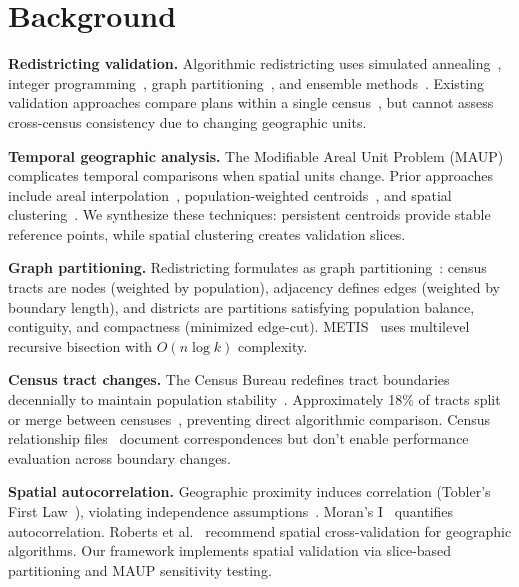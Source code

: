 \section{Background}
\label{sec:background}

\textbf{Redistricting validation.} Algorithmic redistricting uses simulated annealing~\cite{altman1998}, integer programming~\cite{mehrotra1998}, graph partitioning~\cite{ricca2008}, and ensemble methods~\cite{duchin2018, gerrychain2018}. Existing validation approaches compare plans within a single census~\cite{deford2021, fifield2020}, but cannot assess cross-census consistency due to changing geographic units.

\textbf{Temporal geographic analysis.} The Modifiable Areal Unit Problem (MAUP)~\cite{openshaw1984} complicates temporal comparisons when spatial units change. Prior approaches include areal interpolation~\cite{goodchild1980}, population-weighted centroids~\cite{cromley1996}, and spatial clustering~\cite{logan2014}. We synthesize these techniques: persistent centroids provide stable reference points, while spatial clustering creates validation slices.

\textbf{Graph partitioning.} Redistricting formulates as graph partitioning~\cite{hess1965}: census tracts are nodes (weighted by population), adjacency defines edges (weighted by boundary length), and districts are partitions satisfying population balance, contiguity, and compactness (minimized edge-cut). METIS~\cite{karypis1998} uses multilevel recursive bisection with $O(n \log k)$ complexity.

\textbf{Census tract changes.} The Census Bureau redefines tract boundaries decennially to maintain population stability~\cite{census2020tracts}. Approximately 18\% of tracts split or merge between censuses~\cite{schroeder2007}, preventing direct algorithmic comparison. Census relationship files~\cite{census2020relationships} document correspondences but don't enable performance evaluation across boundary changes.

\textbf{Spatial autocorrelation.} Geographic proximity induces correlation (Tobler's First Law~\cite{tobler1970}), violating independence assumptions~\cite{legendre1993}. Moran's I~\cite{moran1950} quantifies autocorrelation. Roberts et al.~\cite{roberts2017} recommend spatial cross-validation for geographic algorithms. Our framework implements spatial validation via slice-based partitioning and MAUP sensitivity testing.
